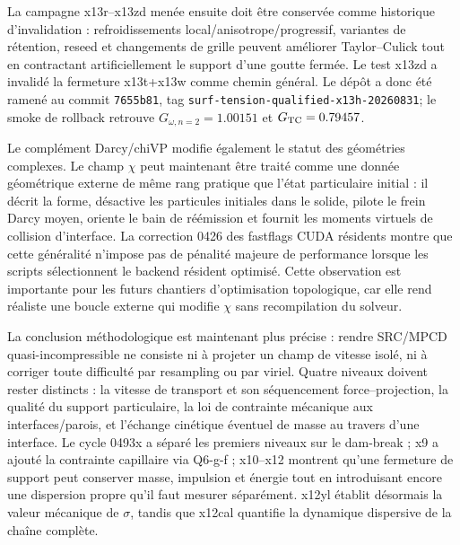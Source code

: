 \documentclass[11pt,a4paper]{article}
\begin{document}
La campagne x13r--x13zd menée ensuite doit être conservée comme historique d'invalidation : refroidissements local/anisotrope/progressif, variantes de rétention, reseed et changements de grille peuvent améliorer Taylor--Culick tout en contractant artificiellement le support d'une goutte fermée. Le test x13zd a invalidé la fermeture x13t+x13w comme chemin général. Le dépôt a donc été ramené au commit \texttt{7655b81}, tag \texttt{surf-tension-qualified-x13h-20260831}; le smoke de rollback retrouve $G_{\omega,n=2}=1.00151$ et $G_{\rm TC}=0.79457$.


Le complément Darcy/chiVP modifie également le statut des géométries complexes. Le champ $\chi$ peut maintenant être traité comme une donnée géométrique externe de même rang pratique que l'état particulaire initial : il décrit la forme, désactive les particules initiales dans le solide, pilote le frein Darcy moyen, oriente le bain de réémission et fournit les moments virtuels de collision d'interface. La correction 0426 des fastflags CUDA résidents montre que cette généralité n'impose pas de pénalité majeure de performance lorsque les scripts sélectionnent le backend résident optimisé. Cette observation est importante pour les futurs chantiers d'optimisation topologique, car elle rend réaliste une boucle externe qui modifie $\chi$ sans recompilation du solveur.

La conclusion méthodologique est maintenant plus précise : rendre SRC/MPCD quasi-incompressible ne consiste ni à projeter un champ de vitesse isolé, ni à corriger toute difficulté par resampling ou par viriel. Quatre niveaux doivent rester distincts : la vitesse de transport et son séquencement force--projection, la qualité du support particulaire, la loi de contrainte mécanique aux interfaces/parois, et l'échange cinétique éventuel de masse au travers d'une interface. Le cycle 0493x a séparé les premiers niveaux sur le dam-break ; x9 a ajouté la contrainte capillaire via Q6-g-f ; x10--x12 montrent qu'une fermeture de support peut conserver masse, impulsion et énergie tout en introduisant encore une dispersion propre qu'il faut mesurer séparément. x12yl établit désormais la valeur mécanique de $\sigma$, tandis que x12cal quantifie la dynamique dispersive de la chaîne complète.
\end{document}
